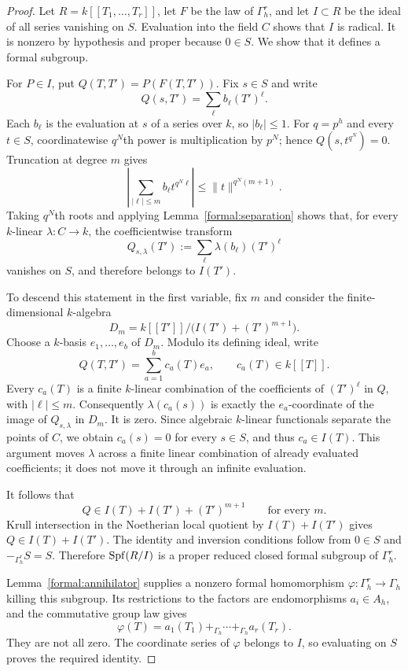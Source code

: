 \begin{proof}
Let $R=k[[T_1,\ldots,T_r]]$, let $F$ be the law of $\Gamma_h^r$,
and let $I\subset R$ be the ideal of all series vanishing on $S$.
Evaluation into the field $C$ shows that $I$ is radical. It is
nonzero by hypothesis and proper because $0\in S$. We show that it
defines a formal subgroup.

For $P\in I$, put $Q(T,T')=P(F(T,T'))$. Fix $s\in S$ and write
\[
  Q(s,T')=\sum_\ell b_\ell(T')^\ell.
\]
Each $b_\ell$ is the evaluation at $s$ of a series over $k$, so
$|b_\ell|\leq1$. For $q=p^h$ and every $t\in S$,
coordinatewise $q^N$th power is multiplication by $p^N$; hence
$Q(s,t^{q^N})=0$. Truncation at degree $m$ gives
\[
  \left|\sum_{|\ell|\leq m}b_\ell t^{q^N\ell}\right|
  \leq\|t\|^{q^N(m+1)}.
\]
Taking $q^N$th roots and applying
Lemma~\ref{formal:separation} shows that, for every $k$-linear
$\lambda:C\to k$, the coefficientwise transform
\[
  Q_{s,\lambda}(T'):=\sum_\ell\lambda(b_\ell)(T')^\ell
\]
vanishes on $S$, and therefore belongs to $I(T')$.

To descend this statement in the first variable, fix $m$ and consider
the finite-dimensional $k$-algebra
\[
  D_m=k[[T']]/\bigl(I(T')+(T')^{m+1}\bigr).
\]
Choose a $k$-basis $e_1,\ldots,e_b$ of $D_m$. Modulo its defining
ideal, write
\[
  Q(T,T')=\sum_{a=1}^b c_a(T)e_a,
  \qquad c_a(T)\in k[[T]].
\]
Every $c_a(T)$ is a finite $k$-linear combination of the coefficients
of $(T')^\ell$ in $Q$, with $|\ell|\leq m$. Consequently
$\lambda(c_a(s))$ is exactly the $e_a$-coordinate of the image of
$Q_{s,\lambda}$ in $D_m$. It is zero. Since algebraic $k$-linear
functionals separate the points of $C$, we obtain $c_a(s)=0$ for
every $s\in S$, and thus $c_a\in I(T)$. This argument moves
$\lambda$ across a finite linear combination of already evaluated
coefficients; it does not move it through an infinite evaluation.

It follows that
\[
  Q\in I(T)+I(T')+(T')^{m+1}
  \qquad\text{for every }m.
\]
Krull intersection \cite[Tag~00IP]{Stacks} in the Noetherian local quotient by
$I(T)+I(T')$ gives $Q\in I(T)+I(T')$. The identity and inversion
conditions follow from $0\in S$ and $-_{\Gamma_h^r}S=S$.
Therefore $\operatorname{Spf}(R/I)$ is a proper reduced closed formal subgroup of
$\Gamma_h^r$.

Lemma~\ref{formal:annihilator} supplies a nonzero formal
homomorphism $\varphi:\Gamma_h^r\to\Gamma_h$ killing this subgroup.
Its restrictions to the factors are endomorphisms
$a_i\in A_h$, and the commutative group law gives
\[
  \varphi(T)=a_1(T_1)+_{\Gamma_h}\cdots+_{\Gamma_h}a_r(T_r).
\]
They are not all zero. The coordinate series of $\varphi$ belongs
to $I$, so evaluating on $S$ proves the required identity.
\end{proof}
